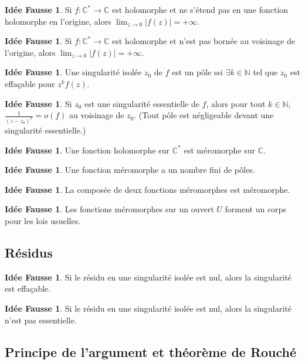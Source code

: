 \documentclass[11pt,a4paper]{article}
\newcommand{\N}{\mathbb{N}}
\newcommand{\C}{\mathbb{C}}
\theoremstyle{definition}
\newtheorem{ideeFausse}[theoreme]{Idée Fausse}
\theoremstyle{plain}
\begin{document}
\begin{ideeFausse}
Si $f : \C^* \to \C$ est holomorphe et ne s'étend pas en une fonction holomorphe en l'origine, alors $\lim_{z\to 0} |f(z)| = +\infty$.
\end{ideeFausse}

\begin{ideeFausse}
Si $f : \C^* \to \C$ est holomorphe et n'est pas bornée au voisinage de l'origine, alors $\lim_{z\to 0} |f(z)| = +\infty$.
\end{ideeFausse}

\begin{ideeFausse}
Une singularité isolée $z_0$ de $f$ est un pôle ssi $\exists k\in \N$ tel que $z_0$ est effaçable pour $z^kf(z)$.
\end{ideeFausse}
%

\begin{ideeFausse} 
Si $z_0$ est une singularité essentielle de $f$, alors pour tout $k\in\N$, $\frac{1}{(z-z_0)^k} = o(f)$ au voisinage de $z_0$. (\og Tout pôle est négligeable devant une singularité essentielle.\fg)
\end{ideeFausse}

\begin{ideeFausse}
Une fonction holomorphe sur $\C^*$ est méromorphe sur $\C$.
\end{ideeFausse}

\begin{ideeFausse}
Une fonction méromorphe a un nombre fini de pôles.
\end{ideeFausse}

\begin{ideeFausse}
La composée de deux fonctions méromorphes est méromorphe.
\end{ideeFausse}

\begin{ideeFausse}
Les fonctions méromorphes sur un ouvert $U$ forment un corps pour les lois usuelles.
\end{ideeFausse}


\subsection{Résidus}

\begin{ideeFausse}
Si le résidu en une singularité isolée est nul, alors la singularité est effaçable.
\end{ideeFausse}

\begin{ideeFausse}
Si le résidu en une singularité isolée est nul, alors la singularité n'est pas essentielle.
\end{ideeFausse}
%
%



\subsection{Principe de l'argument et théorème de Rouché}
%
%
%
\end{document}

